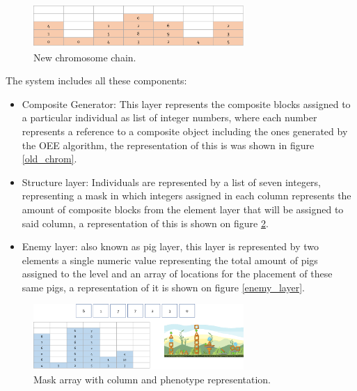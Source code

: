 \documentclass[conference]{IEEEtran}
\begin{document}
    \begin{figure}[htbp]
    \centerline{\includegraphics[width=80mm]{Images/chromosome_chain_new_model.png}}
    \caption{New chromosome chain.}
    \label{new_chrom}
    \end{figure}
    

The system includes all these components:
    \begin{itemize}
        \item Composite Generator:  This layer represents the composite blocks
        assigned to a particular individual as list of integer numbers, where
        each number represents a reference to a composite object including the
        ones generated by the OEE algorithm, the representation of this is was
        shown in figure \ref{old_chrom}.
        \item Structure layer: Individuals are represented by a list of seven
        integers, representing a mask in which integers assigned in each column
        represents the amount of composite blocks from the element layer that
        will be assigned to said column, a representation of this is shown on
        figure \ref{mask_layer}.
        \item Enemy layer: also known as pig layer, this layer is represented by
        two elements a single numeric value representing the total amount of
        pigs assigned to the level and an array of locations for the placement
        of these same pigs, a representation of it is shown on figure
        \ref{enemy_layer}. 
    \end{itemize}
    
    \begin{figure}[htbp]
        \centerline{\includegraphics[width=80mm]{Images/mask_layer.png}}
        \caption{Mask array with column and phenotype representation.}
        \label{mask_layer}
    \end{figure}
    
\end{document}
